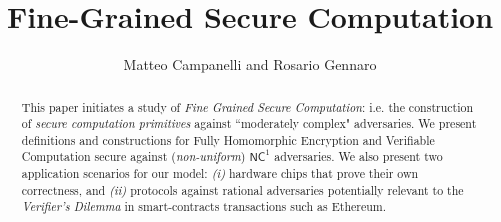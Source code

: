 \documentclass[envcountsect]{llncs}
\title{Fine-Grained Secure Computation}
\author{Matteo Campanelli and Rosario Gennaro}
\institute{The City College of New York\\
{\tt matteo.campanelli@gmail.com} and {\tt rosario@ccny.cuny.edu}
}
\date{}
\begin{document}


\maketitle
\begin{abstract}
  This paper initiates a study of {\em Fine Grained Secure Computation}: i.e. 
  the construction of {\em secure computation primitives} against ``moderately complex" adversaries. We present definitions and constructions for Fully Homomorphic Encryption and Verifiable Computation secure against (\textit{non-uniform}) $\mathsf{NC}^1$ adversaries. We also present two application scenarios for our model: \textit{(i)} hardware chips that prove their own correctness, and \textit{(ii)} protocols against rational adversaries potentially relevant to the {\em Verifier's Dilemma} in smart-contracts transactions such as Ethereum. 
\end{abstract}














\end{document}
